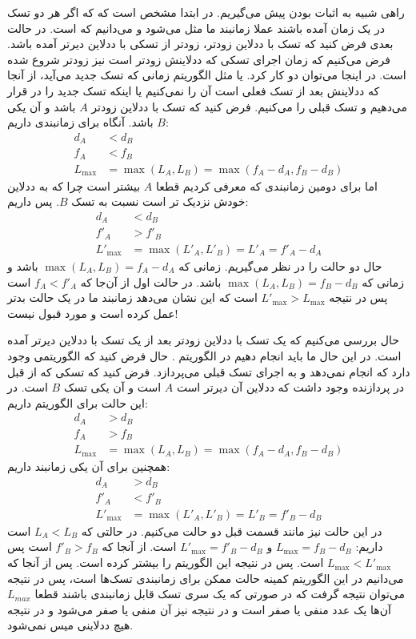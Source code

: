 \documentclass[]{article}
\begin{document}
\printheader

راهی شبیه به اثبات
بودن
پیش می‌گیریم. در ابتدا مشخص است که که اگر هر دو تسک در یک زمان آمده باشند عملا زمانبند ما مثل
می‌شود و می‌دانیم که
است. در حالت بعدی فرض کنید که تسک با ددلاین زودتر، زودتر از تسکی با ددلاین دیرتر آمده باشد.
فرض می‌کنیم که زمان اجرای تسکی که ددلاینش زودتر است نیز زودتر شروع شده است.
در اینجا می‌توان دو کار کرد. یا مثل الگوریتم
زمانی که تسک جدید می‌آید، از آنجا که ددلاینش بعد از تسک فعلی است آن را
نمی‌کنیم یا اینکه تسک جدید را در
قرار می‌دهیم و تسک قبلی را
می‌کنیم. فرض کنید که تسک با ددلاین زودتر
$A$
باشد و آن یکی $B$ باشد. آنگاه برای زمانبندی
داریم:
\begin{align*}
    d_A &< d_B\\
    f_A &< f_B\\
    L_{\text{max}} &= \max(L_{A}, L_{B}) = \max(f_A - d_A, f_B - d_B)
\end{align*}
اما برای دومین زمانبندی که معرفی کردیم قطعا
$A$
بیشتر است چرا که به ددلاین خودش نزدیک تر است نسبت به تسک
$B$.
پس داریم:
\begin{align*}
    d_A &< d_B\\
    f'_A &> f'_B\\
    L'_{\text{max}} &= \max(L'_{A}, L'_{B}) = L'_{A} = f'_A - d_A
\end{align*}
حال دو حالت را در نظر می‌گیریم. زمانی که
$\max(L_{A}, L_{B}) = f_A - d_A$
باشد و زمانی که
$\max(L_{A}, L_{B}) = f_B - d_B$
باشد. در حالت اول از آن‌جا که
$f_A < f'_A$
است پس در نتیجه
$L'_{\text{max}} > L_{\text{max}}$
است که این نشان می‌دهد زمانبند ما در یک حالت بدتر عمل کرده است و مورد قبول نیست!

حال بررسی می‌کنیم که یک تسک با ددلاین زودتر بعد از یک تسک با ددلاین دیرتر آمده است. در این حال ما باید
انجام دهیم در الگوریتم
. حال فرض کنید که الگوریتمی وجود دارد که
انجام نمی‌دهد و به اجرای تسک قبلی می‌پردازد. فرض کنید که تسکی که از قبل در پردازنده وجود داشت که ددلاین آن دیرتر است
$A$ است و آن یکی تسک $B$ است.
در این حالت برای الگوریتم
داریم:
\begin{align*}
    d_A &> d_B\\
    f_A &> f_B\\
    L_{\text{max}} &= \max(L_{A}, L_{B}) = \max(f_A - d_A, f_B - d_B)
\end{align*}
همچنین برای آن یکی زمانبند داریم:
\begin{align*}
    d_A &> d_B\\
    f'_A &< f'_B\\
    L'_{\text{max}} &= \max(L'_{A}, L'_{B}) = L'_B = f'_B - d_B
\end{align*}
در این حالت نیز مانند قسمت قبل دو حالت می‌کنیم. در حالتی که
$L_{A} < L_{B}$
است داریم:
$L_{\text{max}} = f_B - d_B$ و $L'_{\text{max}} = f'_B - d_B$
است. از آنجا که
$f'_B > f_B$
است پس
$L_{\text{max}} < L'_{\text{max}}$
است. پس در نتیجه این الگوریتم
را بیشتر کرده است. پس از آنجا که می‌دانیم در این الگوریتم
کمینه حالت ممکن برای زمانبندی تسک‌ها است، پس در نتیجه می‌توان نتیجه گرفت که در صورتی که یک سری
تسک قابل زمانبندی باشند قطعا
$L_{max}$
آن‌ها یک عدد منفی یا صفر است و در نتیجه
نیز
آن منفی یا صفر می‌شود و در نتیجه هیچ ددلاینی میس نمی‌شود.
\end{document}
